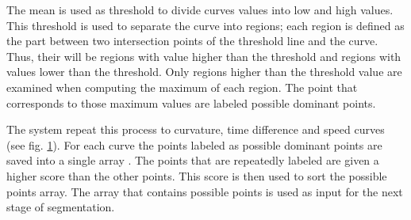 The mean is used as threshold to divide curves values into low and high values.  This threshold is used to separate the curve into regions; each region is defined as the part between two intersection points of the threshold line and the curve.  Thus, their will be regions with value higher than the threshold   and regions with values lower than the threshold. Only regions higher than the threshold value are examined when computing the maximum of each region. The point that corresponds to those maximum values are labeled possible dominant points.  



   
The system repeat this process to curvature, time difference and speed curves (see fig. \ref{fig:speed2}). For each curve the points labeled as possible dominant points are saved into a single array . The points that are repeatedly labeled are given a higher score than the other points. This score is then used to sort the possible points array.  The array that contains possible points is used as input for the next stage of segmentation. 
\begin{figure}[]
	\centering

		
	
	\caption[Data Curves]%
	
	\label{fig:speed2}
\end{figure}


